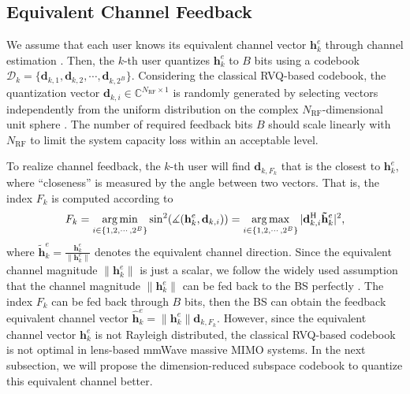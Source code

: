 \documentclass[10pt,twocolumn,twoside]{IEEEtran}
\DeclareMathOperator*{\argmax}{arg\,max}
\DeclareMathOperator*{\argmin}{arg\,min}
\begin{document}
\subsection{Equivalent Channel Feedback}\label{S3.1}
We assume that each user knows its equivalent channel vector $\mathbf{h}_k^e$ through channel estimation \cite{ICC_LYang_RFChannelEstimation}.
Then, the $k$-th user quantizes $\mathbf{h}_k^e$ to $B$ bits using a codebook $\mathcal{D}_k=\{\mathbf{d}_{k,1},\mathbf{d}_{k,2},\cdots,\mathbf{d}_{k,2^B}\}$. Considering the classical RVQ-based codebook, the quantization vector $\mathbf{d}_{k,i}\in\mathbb{C}^{N_\text{RF}\times 1}$ is randomly generated by selecting vectors independently from the uniform distribution on the complex $N_\text{RF}$-dimensional unit sphere \cite{TIT_NJindal_MIMOBroadcast}.
The number of required feedback bits $B$ should scale linearly with $N_\text{RF}$ to limit the system capacity loss within an acceptable level.

To realize channel feedback, the $k$-th user will find $\mathbf{d}_{k,F_k}$ that is the closest to $\mathbf{h}_k^e$,
where ``closeness'' is measured by the angle between two vectors.
That is, the index $F_k$ is computed according to
\begin{align}
F_k=\argmin_{i\in\{1,2,\cdots,2^B\}}\sin^2(\measuredangle(\mathbf{h}_k^e,\mathbf{d}_{k,i}))=\argmax_{i\in\{1,2,\cdots,2^B\}}|\mathbf{d}_{k,i}^{\rm{H}}\mathbf{\tilde{h}}_k^e|^2,
\end{align}
where $\mathbf{\tilde{h}}_k^e=\frac{\mathbf{h}_k^e}{\|\mathbf{h}_k^e\|}$ denotes the equivalent channel direction.
Since the equivalent channel magnitude $\|\mathbf{h}_k^e\|$ is just a scalar,
we follow the widely used assumption that the channel magnitude $\|\mathbf{h}_k^e\|$ can be fed back to the BS perfectly \cite{TIT_DJLove_Grassmannian,TIT_NJindal_MIMOBroadcast}.
The index $F_k$ can be fed back through $B$ bits,
then the BS can obtain the feedback equivalent channel vector $\hat{\mathbf{h}}_k^e=\|\mathbf{h}_k^e\|\mathbf{d}_{k,F_k}$.
However, since the equivalent channel vector $\mathbf{h}_k^e$ is not Rayleigh distributed, the classical RVQ-based codebook is not optimal in lens-based mmWave massive MIMO systems.
In the next subsection, we will propose the dimension-reduced subspace codebook to quantize this equivalent channel better.
\end{document}
